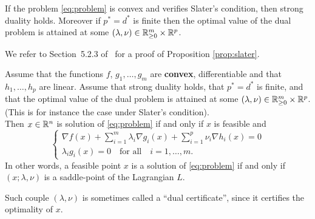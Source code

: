 \documentclass[11pt,nocut]{article}
\begin{document}
\begin{proposition}\label{prop:slater}
	If the problem \eqref{eq:problem} is convex and verifies Slater's condition, then strong duality holds.
	Moreover if $p^*=d^*$ is finite then the optimal value of the dual problem is attained at some $(\lambda,\nu) \in \mathbb{R}_{\geq 0}^m \times \mathbb{R}^p$.
\end{proposition}
We refer to Section~5.2.3 of~\cite{boyd2004convex} for a proof of Proposition \ref{prop:slater}.



\begin{theorem}\label{th:kuhn_tucker}
	Assume that the functions $f$, $g_1, \dots, g_m$ are \textbf{convex}, differentiable and that $h_1, \dots, h_p$ are linear. Assume that strong duality holds, that $p^*=d^*$ is finite, and that the optimal value of the dual problem is attained at some $(\lambda,\nu) \in \mathbb{R}_{\geq 0}^m \times \mathbb{R}^p$. (This is for instance the case under Slater's condition).
	\\

	Then $x \in \mathbb{R}^n$ is solution of \eqref{eq:problem} if and only if $x$ is feasible and
	\begin{equation}\label{eq:kkt}
		\begin{cases}
			\displaystyle \nabla f(x) + \sum_{i=1}^m \lambda_i \nabla g_i(x) + \sum_{i=1}^p \nu_i \nabla h_i(x) = 0 \\
		\lambda_i g_i(x) = 0 \quad \text{for all} \quad i=1, \dots, m.
		\end{cases}
	\end{equation}
	In other words, a feasible point $x$ is a solution of \eqref{eq:problem} if and only if $(x; \lambda, \nu)$ is a saddle-point of the Lagrangian $L$.
\end{theorem}

\noindent Such couple $(\lambda,\nu)$ is sometimes called a ``dual certificate'', since it certifies the optimality of $x$.
\\
\end{document}
